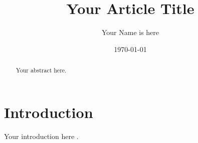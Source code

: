 \documentclass{article}
\title{Your Article Title}
\author{Your Name is here}
\date{\today}
\begin{document}
\maketitle

\begin{abstract}
Your abstract here.
\end{abstract}

\section{Introduction}
Your introduction here \cite{example}.



\end{document}

